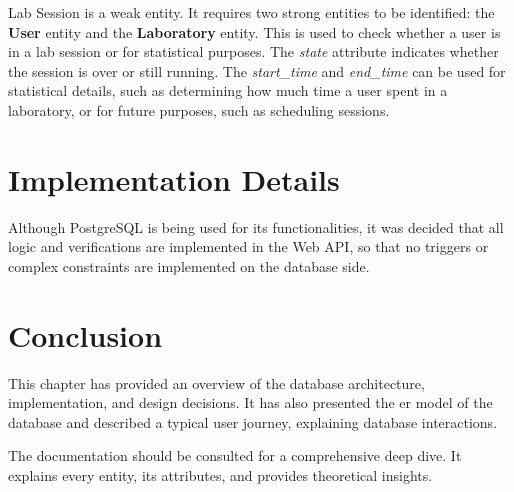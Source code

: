 Lab Session is a weak entity. It requires two strong entities to be identified: the \textbf{User} entity and the \textbf{Laboratory} entity. This is used to check whether a user is in a lab session or for statistical purposes. The \textit{state} attribute indicates whether the session is over or still running. The \textit{start\_time} and \textit{end\_time} can be used for statistical details, such as determining how much time a user spent in a laboratory, or for future purposes, such as scheduling sessions.

\section{Implementation Details}
Although PostgreSQL is being used for its functionalities, it was decided that all logic and verifications are implemented in the Web API, so that no triggers or complex constraints are implemented on the database side.

\section{Conclusion}
This chapter has provided an overview of the database architecture, implementation, and design decisions. It has also presented the \acs{er model} of the database and described a typical user journey, explaining database interactions.

The documentation should be consulted for a comprehensive deep dive. It explains every entity, its attributes, and provides theoretical insights.